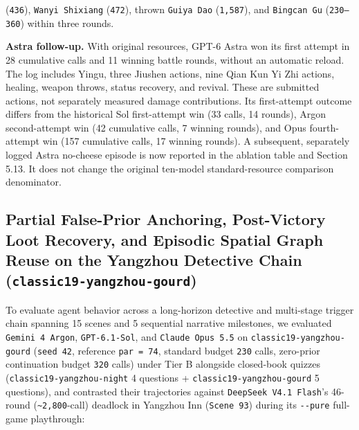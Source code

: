 \documentclass[11pt,a4paper]{article}
\begin{document}
\begin{enumerate}
(\texttt{436}), \texttt{Wanyi\allowbreak{} \allowbreak{}Shixiang} (\texttt{472}), thrown \texttt{Guiya\allowbreak{} \allowbreak{}Dao} (\texttt{1\allowbreak{},\allowbreak{}587}), and \texttt{Bingcan\allowbreak{} \allowbreak{}Gu} (\texttt{230--360}) within three rounds.

\end{enumerate}
\textbf{Astra follow-up.} With original resources, GPT-6 Astra won its first attempt in 28 cumulative calls and 11 winning battle rounds, without an automatic reload. The log includes Yingu, three Jiushen actions, nine Qian Kun Yi Zhi actions, healing, weapon throws, status recovery, and revival. These are submitted actions, not separately measured damage contributions. Its first-attempt outcome differs from the historical Sol first-attempt win (33 calls, 14 rounds), Argon second-attempt win (42 cumulative calls, 7 winning rounds), and Opus fourth-attempt win (157 cumulative calls, 17 winning rounds). A subsequent, separately logged Astra no-cheese episode is now reported in the ablation table and Section 5.13. It does not change the original ten-model standard-resource comparison denominator.

\subsection{\texorpdfstring{Partial False-Prior Anchoring, Post-Victory Loot Recovery, and Episodic Spatial Graph Reuse on the Yangzhou Detective Chain (\texttt{classic19\allowbreak{}-\allowbreak{}yangzhou\allowbreak{}-\allowbreak{}gourd})}{Partial False-Prior Anchoring, Post-Victory Loot Recovery, and Episodic Spatial Graph Reuse on the Yangzhou Detective Chain (classic19-yangzhou-gourd)}}

To evaluate agent behavior across a long-horizon detective and multi-stage trigger chain spanning 15 scenes and 5 sequential narrative milestones, we evaluated \texttt{Gemini\allowbreak{} \allowbreak{}4\allowbreak{} \allowbreak{}Argon}, \texttt{GPT\allowbreak{}-\allowbreak{}6\allowbreak{}.\allowbreak{}1\allowbreak{}-\allowbreak{}Sol}, and \texttt{Claude\allowbreak{} \allowbreak{}Opus\allowbreak{} \allowbreak{}5\allowbreak{}.\allowbreak{}5} on \texttt{classic19\allowbreak{}-\allowbreak{}yangzhou\allowbreak{}-\allowbreak{}gourd} (\texttt{seed\allowbreak{} \allowbreak{}42}, reference \texttt{par\allowbreak{} \allowbreak{}=\allowbreak{} \allowbreak{}74}, standard budget \texttt{230} calls, zero-prior continuation budget \texttt{320} calls) under Tier B alongside closed-book quizzes (\texttt{classic19\allowbreak{}-\allowbreak{}yangzhou\allowbreak{}-\allowbreak{}night} 4 questions + \texttt{classic19\allowbreak{}-\allowbreak{}yangzhou\allowbreak{}-\allowbreak{}gourd} 5 questions), and contrasted their trajectories against \texttt{DeepSeek\allowbreak{} \allowbreak{}V4\allowbreak{}.\allowbreak{}1\allowbreak{} \allowbreak{}Flash}'s 46-round (\texttt{\textasciitilde{}2\allowbreak{},\allowbreak{}800}-call) deadlock in Yangzhou Inn (\texttt{Scene\allowbreak{} \allowbreak{}93}) during its \texttt{-\allowbreak{}-\allowbreak{}pure} full-game playthrough:
\end{document}
